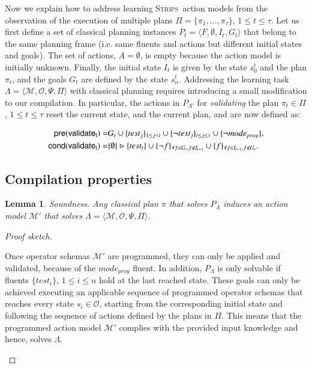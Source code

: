 \documentclass[3p,times]{elsarticle}
\newtheorem{mylemma}[mytheorem]{Lemma}
\newcommand{\pre}{\mathsf{pre}}  %
\newcommand{\cond}{\mathsf{cond}}   %
\newcommand{\strips}{\textsc{Strips}}     %
\newcommand{\tup}[1]{{\langle #1 \rangle}}
\begin{document}
Now we explain how to address learning \strips\ action models from the observation of the execution of multiple plans $\Pi=\{\pi_1,\ldots,\pi_{\tau}\}$, {\tt\small $1\leq t\leq \tau$}. Let us first define a set of classical planning instances $P_t=\tup{F,\emptyset,I_t,G_t}$ that belong to the same planning frame (i.e. same fluents and actions but different initial states and goals). The set of actions, $A=\emptyset$, is empty because the action model is initially unknown. Finally, the initial state $I_t$ is given by the state $s_0^t$ and the plan $\pi_t$, and the goals $G_t$ are defined by the state $s_n^t$. Addressing the learning task $\Lambda=\tup{\mathcal{M},\mathcal{O},\Psi,\Pi}$ with classical planning requires introducing a small modification to our compilation. In particular, the actions in $P_{\Lambda'}$ for {\em validating} the plan $\pi_t\in\Pi$, {\tt\small $1\leq t\leq \tau$} reset the current state, and the current plan, and are now defined as:
\begin{small}
\begin{align*}
\hspace*{7pt}\pre(\mathsf{validate_{t}})=&G_t\cup\{test_j\}_{1\leq j<t}\cup\{\neg test_j\}_{t\leq j\leq \tau}\cup \{\neg mode_{prog}\},\\
\cond(\mathsf{validate_{t}})=&\{\emptyset\}\rhd\{test_t\} \cup \{\neg f\}_{\forall f\in G_t, f \notin I_{t+1}}\cup \{f\}_{\forall f\in I_{t+1}, f \notin G_t}.
\end{align*}
\end{small}


\subsection{Compilation properties}

\begin{mylemma}
Soundness. Any classical plan $\pi$ that solves $P_{\Lambda}$ induces an action model $\mathcal{M}'$ that solves $\Lambda=\tup{\mathcal{M},\mathcal{O},\Psi,\Pi}$.
\end{mylemma}

\begin{proof}[Proof sketch]
\begin{small}
Once operator schemas $\mathcal{M}'$ are programmed, they can only be applied and validated, because of the $mode_{prog}$ fluent. In addition, $P_{\Lambda}$ is only solvable if fluents $\{test_i\}$, {\small $1\leq i\leq n$} hold at the last reached state. These goals can only be achieved executing an applicable sequence of programmed operator schemas that reaches every state $s_i\in\mathcal{O}$, starting from the corresponding initial state and following the sequence of actions defined by the plans in $\Pi$. This means that the programmed action model $\mathcal{M}'$ complies with the provided input knowledge and hence, solves $\Lambda$.
\end{small}
\end{proof}
\end{document}
